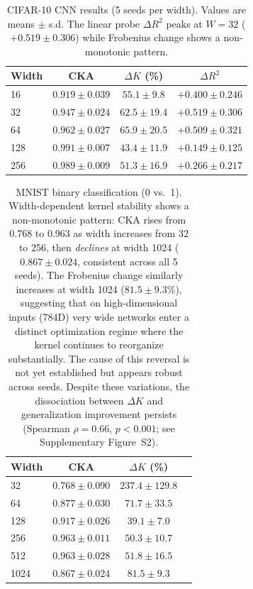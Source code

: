 \documentclass[10pt]{article}
\begin{document}
\begin{table}[ht]
    \centering\footnotesize
    \setlength{\tabcolsep}{4pt}
    \caption{CIFAR-10 CNN results (5 seeds per width).  Values are means $\pm$ s.d.  The linear probe $\Delta R^2$ peaks at $W=32$ ($+0.519\pm0.306$) while Frobenius change shows a non-monotonic pattern.}
    \label{tab:cnn_cifar}
    \begin{tabular}{lccc}
    \toprule
    Width & CKA & $\Delta K$ (\%) & $\Delta R^2$ \\
    \midrule
    16  & $0.919\pm0.039$ & $55.1\pm9.8$  & $+0.400\pm0.246$ \\
    32  & $0.947\pm0.024$ & $62.5\pm19.4$ & $+0.519\pm0.306$ \\
    64  & $0.962\pm0.027$ & $65.9\pm20.5$ & $+0.509\pm0.321$ \\
    128 & $0.991\pm0.007$ & $43.4\pm11.9$ & $+0.149\pm0.125$ \\
    256 & $0.989\pm0.009$ & $51.3\pm16.9$ & $+0.266\pm0.217$ \\
    \bottomrule
    \end{tabular}
\end{table}

\begin{table}[ht]
    \centering
    \caption{MNIST binary classification (0 vs.\ 1).  Width-dependent kernel stability shows a non-monotonic pattern: CKA rises from 0.768 to 0.963 as width increases from 32 to 256, then \emph{declines} at width 1024 ($0.867\pm0.024$, consistent across all 5 seeds).  The Frobenius change similarly increases at width 1024 ($81.5\pm9.3\%$), suggesting that on high-dimensional inputs (784D) very wide networks enter a distinct optimization regime where the kernel continues to reorganize substantially.  The cause of this reversal is not yet established but appears robust across seeds.  Despite these variations, the dissociation between $\Delta K$ and generalization improvement persists (Spearman $\rho=0.66$, $p<0.001$; see Supplementary Figure~S2).}
    \label{tab:mnist}
    \begin{tabular}{lccc}
    \toprule
    Width & CKA & $\Delta K$ (\%) \\
    \midrule
    32   & $0.768\pm0.090$ & $237.4\pm129.8$ \\
    64   & $0.877\pm0.030$ & $71.7\pm33.5$   \\
    128  & $0.917\pm0.026$ & $39.1\pm7.0$    \\
    256  & $0.963\pm0.011$ & $50.3\pm10.7$   \\
    512  & $0.963\pm0.028$ & $51.8\pm16.5$   \\
    1024 & $0.867\pm0.024$ & $81.5\pm9.3$    \\
    \bottomrule
    \end{tabular}
\end{table}
\end{document}
